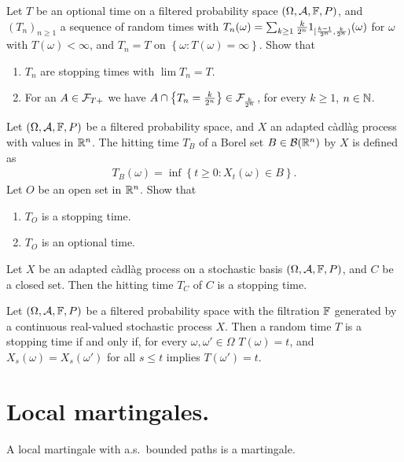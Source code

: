  Let $T$ be an
optional time on a filtered probability space $(\Omega, \mathcal A, \mathbb F, P)$, and
$\left( T_n \right)_{n\geq 1}$ a sequence of random times with $T_n(\omega) =
\sum_{k\geq 1} \frac{k}{2^n} 1_{ [ \frac{k-1}{2^n}, \frac{k}{2^n} ) }(\omega)$ for
$\omega$ with $T(\omega)<\infty$, and $T_n=T$ on $\left\{ \omega : T(\omega)=\infty \right\}$.
Show that
\begin{enumerate}
    \item $T_n$ are stopping times with $\lim T_n = T$. 
    \item For an $A\in \mathcal F_{T+}$ we have $A \cap \left\{ T_n = \frac{k}{2^n} \right\} \in \mathcal F_{\frac{k}{2^n}}$,
        for every $k\geq 1$, $n\in\mathbb N$.
\end{enumerate}


  Let $(\Omega, \mathcal A, \mathbb F, P)$ be a
filtered probability space, and $X$ an adapted c\`adl\`ag process with values
in $\mathbb R^{n}$. The hitting time $T_B$ of a Borel set $B\in\mathcal B(\mathbb R^{n})$ by $X$
is defined as
\begin{align*}
    T_B(\omega) = \operatorname{inf} \left\{ t \geq 0 : X_t(\omega) \in B \right\}.
\end{align*}
Let $O$ be an open set in $\mathbb R^{n}$. Show that
\begin{enumerate}
    \item $T_O$ is a stopping time. 
    \item $T_O$ is an optional time. 
\end{enumerate}


 Let $X$ be an adapted c\`adl\`ag process on a
stochastic basis $(\Omega, \mathcal A, \mathbb F, P)$, and $C$ be a closed set. Then the hitting
time $T_C$ of $C$ is a stopping time. 

 Let $(\Omega, \mathcal A, \mathbb F, P)$ be a
filtered probability space with the filtration $\mathbb F$ generated by a continuous
real-valued stochastic process $X$. Then a random time $T$ is a stopping time
if and only if, for every $\omega, \omega' \in \Omega$ $T(\omega)=t$, and
$X_{s}(\omega) = X_s(\omega')$ for all $s\leq t$ implies $T(\omega') = t$. 


\section{Local martingales. }

 A local martingale
with a.s.\ bounded paths is a martingale.


